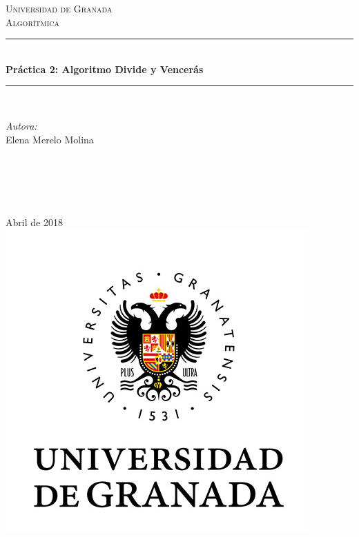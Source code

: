 \documentclass[12pt]{article}
\begin{document}
\begin{titlepage}
\newcommand{\HRule}{\rule{\linewidth}{0.5mm}}
\center
\textsc{\LARGE Universidad de Granada}\\[1.5cm] %
\textsc{\Large Algorítmica}\\[0.5cm] %
\HRule \\[0.4cm]
{ \huge \bfseries Práctica 2: Algoritmo Divide y Vencerás}\\[0.4cm] %
\HRule \\[1.5cm]
\begin{minipage}{0.4\textwidth}
\begin{flushleft} \large
\emph{Autora:}\\
Elena Merelo Molina \textsc{} %
\end{flushleft}
\end{minipage}
~
\begin{minipage}{0.4\textwidth}
\begin{flushright} \large
\emph{} \\
\textsc{} %
\end{flushright}
\end{minipage}\\[2cm]
{\large Abril de 2018}\\[2cm] %
\includegraphics[scale=0.5]{./logo.jpg}
\vfill %
\end{titlepage}
\end{document}
